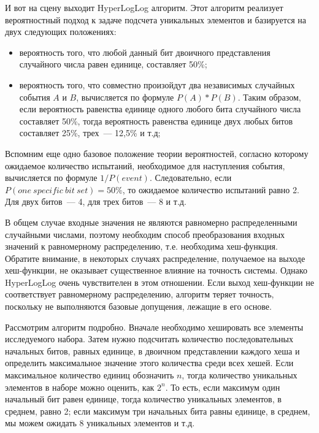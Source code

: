 И вот на сцену выходит HyperLogLog алгоритм. Этот алгоритм реализует вероятностный подход к задаче подсчета уникальных элементов и базируется на двух следующих положениях:

\begin{itemize}
  \item вероятность того, что любой данный бит двоичного представления случайного числа равен единице, составляет 50\%;
  \item вероятность того, что совместно произойдут два независимых случайных события $A$ и $B$, вычисляется по формуле $P(A)*P(B)$. Таким образом, если вероятность равенства единице одного любого бита случайного числа составляет 50\%, тогда вероятность равенства единице двух любых битов составляет 25\%, трех~--- 12,5\% и т.д;
\end{itemize}

Вспомним еще одно базовое положение теории вероятностей, согласно которому ожидаемое количество испытаний, необходимое для наступления события, вычисляется по формуле $1/P(event)$. Следовательно, если $P(one\ specific\ bit\ set) = 50\%$, то ожидаемое количество испытаний равно 2. Для двух битов~--- 4, для трех битов~--- 8 и т.д.

В общем случае входные значения не являются равномерно распределенными случайными числами, поэтому необходим способ преобразования входных значений к равномерному распределению, т.е. необходима хеш-функция. Обратите внимание, в некоторых случаях распределение, получаемое на выходе хеш-функции, не оказывает существенное влияние на точность системы. Однако HyperLogLog очень чувствителен в этом отношении. Если выход хеш-функции не соответствует равномерному распределению, алгоритм теряет точность, поскольку не выполняются базовые допущения, лежащие в его основе.

Рассмотрим алгоритм подробно. Вначале необходимо хешировать все элементы исследуемого набора. Затем нужно подсчитать количество последовательных начальных битов, равных единице, в двоичном представлении каждого хеша и определить максимальное значение этого количества среди всех хешей. Если максимальное количество единиц обозначить $n$, тогда количество уникальных элементов в наборе можно оценить, как $2^n$. То есть, если максимум один начальный бит равен единице, тогда количество уникальных элементов, в среднем, равно 2; если максимум три начальных бита равны единице, в среднем, мы можем ожидать 8 уникальных элементов и т.д.

